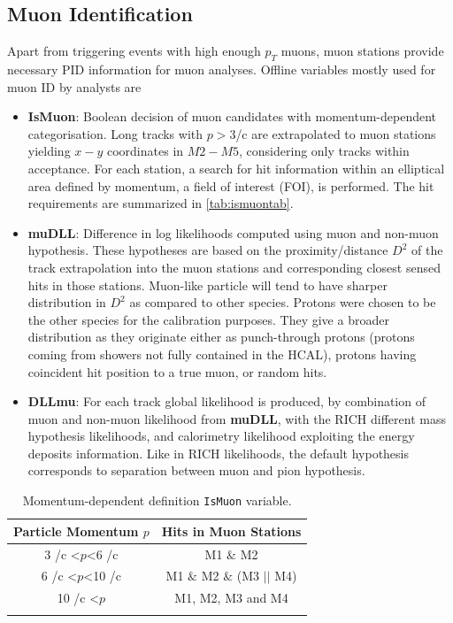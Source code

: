 \subsection{Muon Identification }
\label{muonID}
Apart from triggering events with high enough $p_{T}$ muons, muon stations provide necessary PID information for muon analyses. Offline variables mostly used for muon ID by analysts are
\begin{itemize}
	\item{\textbf{IsMuon}: Boolean decision of muon candidates with momentum-dependent categorisation. Long tracks with $p>3$\gev/c are extrapolated to muon stations yielding $x-y$ coordinates in $M2-M5$, considering only tracks within acceptance. For each station, a search for hit information within an elliptical area defined by momentum, a field of interest (\Gls{FOI}), is performed. The hit requirements are summarized in \autoref{tab:ismuontab}.}
	\item{\textbf{muDLL}: Difference in log likelihoods computed using muon and non-muon hypothesis. These hypotheses are based on the proximity/distance $D^{2}$ of the track extrapolation into the muon stations and corresponding closest sensed hits in those stations. Muon-like particle will tend to have sharper distribution in $D^{2}$ as compared to other species. Protons were chosen to be the other species for the calibration purposes. They give a broader distribution as they originate either as punch-through protons (protons coming from showers not fully contained in the \gls{HCAL}), protons having coincident hit position to a true muon, or random hits.}
	\item{\textbf{DLLmu}}:  For each track global likelihood is produced, by combination of muon and non-muon likelihood from \textbf{muDLL}, with the \Gls{RICH} different mass hypothesis likelihoods, and calorimetry likelihood exploiting the energy deposits information. Like in \Gls{RICH} likelihoods, the default hypothesis corresponds to separation between muon and pion hypothesis.    

\end{itemize}


\begin{table}[!h]
	\centering
	\hspace*{-0.8cm}
	\begin{tabular}{c c}
		\hline
		Particle Momentum $p$  & Hits in Muon Stations \\ \hline
		3 \gev/c <$p$<6 \gev/c & M1 $\&$ M2\\
		6 \gev/c <$p$<10 \gev/c & M1 $\&$ M2 $\&$ (M3 $||$ M4) \\
		10 \gev/c <$p$ & M1, M2, M3 and M4 \\ \\\hline      
	\end{tabular}
	\caption{Momentum-dependent definition \texttt{IsMuon} variable.}
	\label{tab:ismuontab}
\end{table}   

